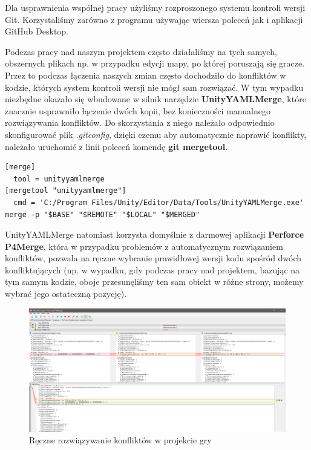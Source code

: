 \documentclass[openright]{xmgr}
\newcommand{\name}[1]{\textbf{\textcolor{NavyBlue}{#1}}}
\begin{document}
    Dla usprawnienia wspólnej pracy użyliśmy rozproszonego systemu kontroli wersji Git. Korzystaliśmy zarówno z programu używając wiersza poleceń jak i aplikacji GitHub Desktop.

    Podczas pracy nad naszym projektem często działaliśmy na tych samych, obszernych plikach np. w przypadku edycji mapy, po której poruszają się gracze. 
    Przez to podczas łączenia naszych zmian często dochodziło do konfliktów w kodzie, których system kontroli wersji nie mógł sam rozwiązać. 
    W tym wypadku niezbędne okazało się wbudowane w silnik narzędzie \name{UnityYAMLMerge}, które znacznie usprawniło łączenie dwóch kopii, bez konieczności manualnego rozwiązywania konfliktów. Do skorzystania z niego należało odpowiednio skonfigurować plik \textit{.gitconfig}, dzięki czemu aby automatycznie naprawić konflikty, należało uruchomić z linii poleceń komendę \name{git mergetool}.

\begin{minipage}{\textwidth}
\begin{lstlisting}[caption={Zawartość pliku .gitconfig po konfiguracji narzędzia UnityYAMLMerge}]
[merge]
  tool = unityyamlmerge
[mergetool "unityyamlmerge"]
  cmd = 'C:/Program Files/Unity/Editor/Data/Tools/UnityYAMLMerge.exe' merge -p "$BASE" "$REMOTE" "$LOCAL" "$MERGED"
\end{lstlisting}
\end{minipage}

    UnityYAMLMerge natomiast korzysta domyślnie z darmowej aplikacji \name{Perforce P4Merge}, która w przypadku problemów z automatycznym rozwiązaniem konfliktów, pozwala na ręczne wybranie prawidłowej wersji kodu spośród dwóch konfliktujących (np. w wypadku, gdy podczas pracy nad projektem, bazując na tym samym kodzie, oboje przesunęliśmy ten sam obiekt w różne strony, możemy wybrać jego ostateczną pozycję).

    \begin{figure}[H]
    \includegraphics[width=\textwidth]{p4merge.png}
    \caption{Ręczne rozwiązywanie konfliktów w projekcie gry}
    \end{figure}
\end{document}

